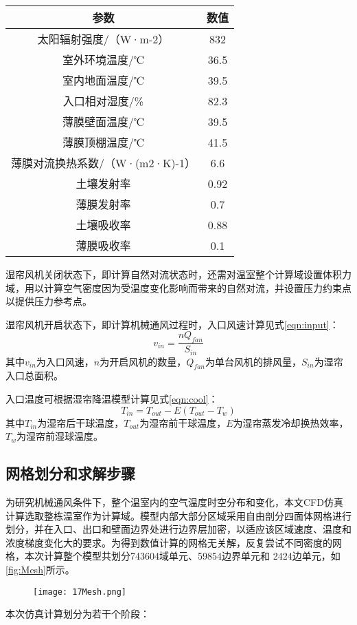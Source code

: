 		\begin{table}[!htbp]
  			\centering
  			\begin{tabular}{cc} \toprule
			参数 & 数值\\ \midrule
			太阳辐射强度/（W·m-2） & 	832\\
			室外环境温度/℃	 & 36.5\\
			室内地面温度/℃ & 	39.5\\
			入口相对湿度/\%	 & 82.3\\
			薄膜壁面温度/℃	 & 39.5\\
			薄膜顶棚温度/℃	 & 41.5\\
			薄膜对流换热系数/（W·(m2·K)-1） & 6.6\\
			土壤发射率 & 0.92\\
			薄膜发射率 & 0.7\\
			土壤吸收率 & 0.88\\
			薄膜吸收率 & 0.1\\ \bottomrule
 			\end{tabular}
		\end{table}
湿帘风机关闭状态下，即计算自然对流状态时，还需对温室整个计算域设置体积力域，用以计算空气密度因为受温度变化影响而带来的自然对流，并设置压力约束点以提供压力参考点。

湿帘风机开启状态下，即计算机械通风过程时，入口风速计算\supercite{RenShougang2015}见式\ref{eqn:input}：
	\begin{equation}
		\label{eqn:input}
		v_{in} = \frac{n Q_{fan}}{S_{in}}
	\end{equation}
其中$v_{in}$为入口风速，$n$为开启风机的数量，$Q_{fan}$为单台风机的排风量，$S_{in}$为湿帘入口总面积。

入口温度可根据湿帘降温模型计算\supercite{JBT}见式\ref{eqn:cool}：
	\begin{equation}
		\label{eqn:cool}
		T_{in}=T_{out}-E (T_{out} - T_{w})
	\end{equation}
其中$T_{in}$为湿帘后干球温度，$T_{out}$为湿帘前干球温度，$E$为湿帘蒸发冷却换热效率，$T_w$为湿帘前湿球温度。

	\subsection{网格划分和求解步骤}
为研究机械通风条件下，整个温室内的空气温度时空分布和变化，本文CFD仿真计算选取整栋温室作为计算域。模型内部大部分区域采用自由剖分四面体网格进行划分，并在入口、出口和壁面边界处进行边界层加密，以适应该区域速度、温度和浓度梯度变化大的要求。为得到数值计算的网格无关解，反复尝试不同密度的网格，本次计算整个模型共划分743604域单元、59854边界单元和 2424边单元，如\ref{fig:Mesh}所示。
	\begin{figure}[!htbp]
		\centering
		\texttt{[image: 17Mesh.png]}
	\end{figure}
本次仿真计算划分为若干个阶段：

